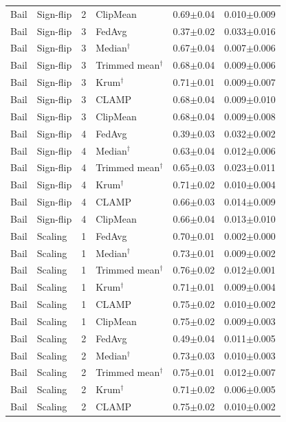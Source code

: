 \begin{longtable}{llclcc}
Bail & Sign-flip & 2 & ClipMean & 0.69$\pm$0.04 & 0.010$\pm$0.009 \\
Bail & Sign-flip & 3 & FedAvg & 0.37$\pm$0.02 & 0.033$\pm$0.016 \\
Bail & Sign-flip & 3 & Median$^\dagger$ & 0.67$\pm$0.04 & 0.007$\pm$0.006 \\
Bail & Sign-flip & 3 & Trimmed mean$^\dagger$ & 0.68$\pm$0.04 & 0.009$\pm$0.006 \\
Bail & Sign-flip & 3 & Krum$^\dagger$ & 0.71$\pm$0.01 & 0.009$\pm$0.007 \\
Bail & Sign-flip & 3 & CLAMP & 0.68$\pm$0.04 & 0.009$\pm$0.010 \\
Bail & Sign-flip & 3 & ClipMean & 0.68$\pm$0.04 & 0.009$\pm$0.008 \\
Bail & Sign-flip & 4 & FedAvg & 0.39$\pm$0.03 & 0.032$\pm$0.002 \\
Bail & Sign-flip & 4 & Median$^\dagger$ & 0.63$\pm$0.04 & 0.012$\pm$0.006 \\
Bail & Sign-flip & 4 & Trimmed mean$^\dagger$ & 0.65$\pm$0.03 & 0.023$\pm$0.011 \\
Bail & Sign-flip & 4 & Krum$^\dagger$ & 0.71$\pm$0.02 & 0.010$\pm$0.004 \\
Bail & Sign-flip & 4 & CLAMP & 0.66$\pm$0.03 & 0.014$\pm$0.009 \\
Bail & Sign-flip & 4 & ClipMean & 0.66$\pm$0.04 & 0.013$\pm$0.010 \\
Bail & Scaling & 1 & FedAvg & 0.70$\pm$0.01 & 0.002$\pm$0.000 \\
Bail & Scaling & 1 & Median$^\dagger$ & 0.73$\pm$0.01 & 0.009$\pm$0.002 \\
Bail & Scaling & 1 & Trimmed mean$^\dagger$ & 0.76$\pm$0.02 & 0.012$\pm$0.001 \\
Bail & Scaling & 1 & Krum$^\dagger$ & 0.71$\pm$0.01 & 0.009$\pm$0.004 \\
Bail & Scaling & 1 & CLAMP & 0.75$\pm$0.02 & 0.010$\pm$0.002 \\
Bail & Scaling & 1 & ClipMean & 0.75$\pm$0.02 & 0.009$\pm$0.003 \\
Bail & Scaling & 2 & FedAvg & 0.49$\pm$0.04 & 0.011$\pm$0.005 \\
Bail & Scaling & 2 & Median$^\dagger$ & 0.73$\pm$0.03 & 0.010$\pm$0.003 \\
Bail & Scaling & 2 & Trimmed mean$^\dagger$ & 0.75$\pm$0.01 & 0.012$\pm$0.007 \\
Bail & Scaling & 2 & Krum$^\dagger$ & 0.71$\pm$0.02 & 0.006$\pm$0.005 \\
Bail & Scaling & 2 & CLAMP & 0.75$\pm$0.02 & 0.010$\pm$0.002 \\

\end{longtable}
